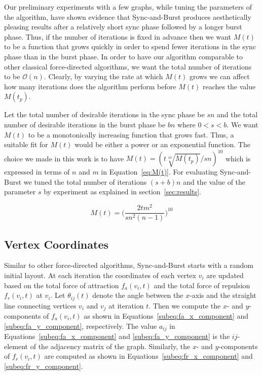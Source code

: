 \documentclass{llncs}
\begin{document}
Our preliminary experiments with a few graphs, while tuning the parameters of the algorithm, have shown evidence that Sync-and-Burst produces aesthetically pleasing results after a relatively short sync phase followed by a longer burst phase. Thus, if the number of iterations is fixed in advance then we want $M(t)$ to be a function that grows quickly in order to spend fewer iterations in the sync phase than in the burst phase. In order to have our algorithm comparable to other classical force-directed algorithms, we want the total number of iterations to be $\mathcal{O}(n)$. Clearly, by varying the rate at which $M(t)$ grows we can affect how many iterations does the algorithm perform before $M(t)$ reaches the value $M(t_p)$. 

Let the total number of desirable iterations in the sync phase be $sn$ and the total number of desirable iterations in the burst phase be $bn$ where $0 < s < b$. We want $M(t)$ to be a monotonically increasing function that grows fast. Thus, a suitable fit for $M(t)$ would be either a power or an exponential function. The choice we made in this work is to have $M(t) = (t\sqrt[10]{M(t_p)}/sn)^{10}$ which is expressed in terms of $n$ and $m$ in Equation~\eqref{eq:M(t)}. For evaluating Sync-and-Burst we tuned the total number of iterations $(s+b)n$ and the value of the parameter $s$ by experiment as explained in section~\ref{sec:results}.

\begin{equation}
\label{eq:M(t)}
M(t) = \Bigg(\frac{2tm^2}{sn^2(n-1)}\Bigg)^{10}
\end{equation}

\subsection{Vertex Coordinates}\label{subsec:algorithm:coordinates}

Similar to other force-directed algorithms, Sync-and-Burst starts with a random initial layout. At each iteration the coordinates of each vertex $v_i$ are updated based on the total force of attraction $f_a(v_i, t)$ and the total force of repulsion $f_r(v_i, t)$ at $v_i$. Let $\theta_{ij}(t)$ denote the angle between the $x$-axis and the straight line connecting vertices $v_i$ and $v_j$ at iteration $t$. Then we compute the $x$- and $y$-components of $f_a(v_i, t)$ as shown in Equations~\eqref{subeq:fa_x_component} and \eqref{subeq:fa_y_component}, respectively. The value $a_{ij}$ in Equations~\eqref{subeq:fa_x_component} and \eqref{subeq:fa_y_component} is the $ij$-element of the adjacency matrix of the graph. Similarly, the $x$- and $y$-components of $f_r(v_i, t)$ are computed as shown in Equations~\eqref{subeq:fr_x_component} and \eqref{subeq:fr_y_component}. 
\end{document}
